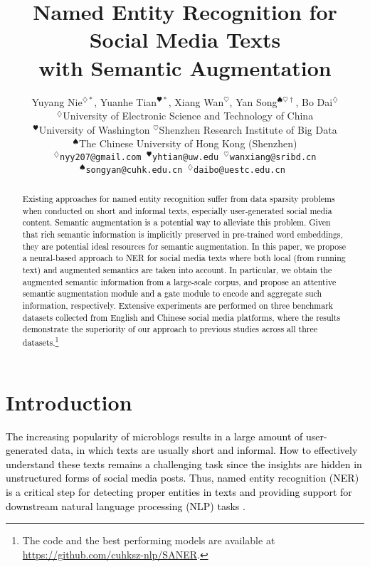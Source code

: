 \documentclass[11pt,a4paper]{article}
\title{Named Entity Recognition for Social Media Texts \\
with Semantic Augmentation
}
\author{
    Yuyang Nie$^{\diamondsuit*}$, \hspace{0.1cm}
    Yuanhe Tian$^{\varheart*}$, \hspace{0.1cm}
    Xiang Wan$^{\heartsuit}$, \hspace{0.1cm}
    Yan Song$^{\spadesuit\heartsuit\dag}$, \hspace{0.1cm}
    Bo Dai$^{\diamondsuit}$ \\
$^{\diamondsuit}$University of Electronic Science and Technology of China\\
    $^{\varheart}$University of Washington \hspace{0.1cm} $^{\heartsuit}$Shenzhen Research Institute of Big Data\\
    $^{\spadesuit}$The Chinese University of Hong Kong (Shenzhen)\\
    \tt  $^{\diamondsuit}$nyy207@gmail.com \hspace{0.1cm} $^{\varheart}$yhtian@uw.edu \hspace{0.1cm} $^{\heartsuit}$wanxiang@sribd.cn\\
    \tt $^{\spadesuit}$songyan@cuhk.edu.cn \hspace{0.1cm} $^{\diamondsuit}$daibo@uestc.edu.cn
}
\date{}
\begin{document}
\maketitle

\def\thefootnote{*}
\def\thefootnote{\dag}

\def\thefootnote{\arabic{footnote}}



\begin{abstract}
\textcolor{black}{
Existing approaches for named entity recognition suffer from data sparsity problems when conducted on short and informal texts, especially user-generated social media content.
Semantic augmentation is a potential way to alleviate this problem.
Given that rich semantic information is implicitly preserved in pre-trained word embeddings, they are potential ideal resources for semantic augmentation.
In this paper, we propose a neural-based approach to NER for social media texts where both local (from running text) and augmented semantics are taken into account.
In particular, we obtain the augmented semantic information from a large-scale corpus, and propose an 
attentive semantic
augmentation module and a gate module to encode and aggregate such information, respectively.
Extensive experiments are performed on three benchmark datasets collected from English and Chinese social media platforms,
where the results demonstrate the superiority of our approach to previous studies across all three datasets.\footnote{The code and the best performing models are available at \url{https://github.com/cuhksz-nlp/SANER}.}
}

\end{abstract}

\section{Introduction}

\textcolor{black}{
The increasing popularity of microblogs results in a large amount of user-generated data, in which texts are usually short and informal.
How to effectively understand these texts remains a challenging task since the insights are hidden in unstructured forms of social media posts.
Thus, named entity recognition (NER) is a critical step for detecting proper entities in texts and providing support for downstream natural language processing (NLP) tasks \cite{DBLP:conf/aaai/PangLGXSC19,DBLP:conf/acl/MartinsMM19}.
}
\end{document}
